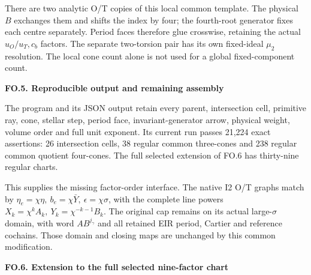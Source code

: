 There are two analytic O/T copies of this local
common template. The physical \(B\) exchanges them
and shifts the index by four; the fourth-root
generator fixes each centre separately. Period
faces therefore glue crosswise, retaining the actual
\(u_O/u_T,c_b\) factors. The separate two-torsion pair
has its own fixed-ideal \(\mu_2\) resolution. The
local cone count alone is not used for a global
fixed-component count.

\par

\medskip\noindent\textbf{FO.5. Reproducible output and remaining assembly}

\par\nobreak

The program
and its JSON output retain every parent, intersection
cell, primitive ray, cone, stellar step, period face,
invariant-generator arrow, physical weight, volume
order and full unit exponent. Its current run passes
21,224 exact assertions: 26 intersection cells,
38 regular common three-cones and 238 regular
common quotient four-cones. The full selected
extension of FO.6 has thirty-nine regular charts.

This supplies the missing factor-order interface.
The native I2 O/T graphs match by
\(\eta_e=\chi\eta,\ b_e=\chi\bar Y,\
\epsilon=\chi\sigma\), with the complete line
powers \(X_k=\chi^kA_k,\ Y_k=\chi^{-k-1}B_k\).
The original cap remains on its actual large-\(\sigma\)
domain, with word \(AB^{j_\gamma}\) and all retained
EIR period, Cartier and reference cochains. Those
domain and closing maps are unchanged by this
common modification.

\par

\medskip\noindent\textbf{FO.6. Extension to the full selected nine-factor chart}

\par\nobreak

